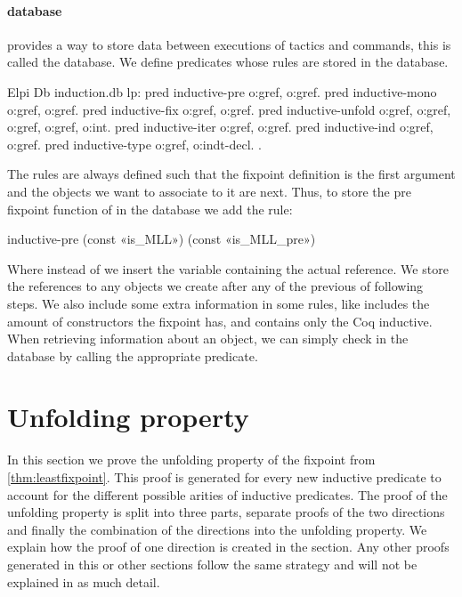 \documentclass[thesis.tex]{subfiles}
\begin{document}
\paragraph{\ce database}
\ce provides a way to store data between executions of tactics and commands, this is called the database. We define predicates whose rules are stored in the database.
\begin{coqcode}
  Elpi Db induction.db lp:{{
    pred inductive-pre o:gref, o:gref.
    pred inductive-mono o:gref, o:gref.
    pred inductive-fix o:gref, o:gref.
    pred inductive-unfold o:gref, o:gref, o:gref, 
                          o:gref, o:int.
    pred inductive-iter o:gref, o:gref.
    pred inductive-ind o:gref, o:gref.
    pred inductive-type o:gref, o:indt-decl.
  }}.
\end{coqcode}
The rules are always defined such that the fixpoint definition is the first argument and the objects we want to associate to it are next. Thus, to store the pre fixpoint function of  in the database we add the rule:
\begin{elpicode}
  inductive-pre (const «is_MLL») 
                (const «is_MLL_pre»)
\end{elpicode}
Where instead of  we insert the variable containing the actual reference. We store the references to any objects we create after any of the previous of following steps. We also include some extra information in some rules, like  includes the amount of constructors the fixpoint has, and  contains only the Coq inductive. When retrieving information about an object, we can simply check in the database by calling the appropriate predicate.

\section{Unfolding property}\label{sec:unfolding}
In this section we prove the unfolding property of the fixpoint from \cref{thm:leastfixpoint}. This proof is generated for every new inductive predicate to account for the different possible arities of inductive predicates. The proof of the unfolding property is split into three parts, separate proofs of the two directions and finally the combination of the directions into the unfolding property. We explain how the proof of one direction is created in the section. Any other proofs generated in this or other sections follow the same strategy and will not be explained in as much detail.
\end{document}
